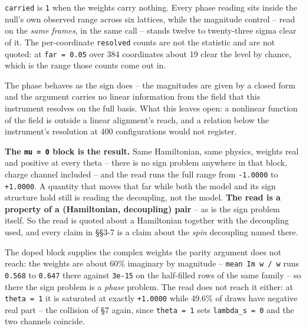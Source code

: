 \documentclass[10pt,letterpaper,twocolumn]{article}
\begin{document}
\texttt{carried} is \texttt{1} when the weights carry nothing. Every phase reading sits inside the null's own
observed range across six lattices, while the magnitude control -- read on the \emph{same frames}, in
the same call -- stands twelve to twenty-three sigma clear of it. The per-coordinate \texttt{resolved}
counts are not the statistic and are not quoted: at \texttt{far\ =\allowbreak{}\ 0.\allowbreak{}05} over 384 coordinates about 19
clear the level by chance, which is the range those counts come out in.

The phase behaves as the sign does -- the magnitudes are given by a closed form and the argument
carries no linear information from the field that this instrument resolves on the full basis. What
this leaves open: a nonlinear function of the field is outside a linear alignment's reach, and a
relation below the instrument's resolution at 400 configurations would not register.

\textbf{The \texttt{mu\ =\allowbreak{}\ 0} block is the result.} Same Hamiltonian, same physics, weights real and positive at
every theta -- there is no sign problem anywhere in that block, charge channel included -- and the
read runs the full range from \texttt{-{}\allowbreak{}1.\allowbreak{}0000} to \texttt{+\allowbreak{}1.\allowbreak{}0000}. A quantity that moves that far while both the
model and its sign structure hold still is reading the decoupling, not the model. \textbf{The read is a
property of a (Hamiltonian, decoupling) pair} -- as is the sign problem itself. So the read is
quoted about a Hamiltonian together with the decoupling used, and every claim in §§3-7 is a claim
about the \emph{spin} decoupling named there.

The doped block supplies the complex weights the parity argument does not reach: the weights are
about 60\% imaginary by magnitude -- \texttt{mean\ \textbar{}\allowbreak{}Im\ w\textbar{}\allowbreak{}\ /\allowbreak{}\ \textbar{}\allowbreak{}w\textbar{}\allowbreak{}} runs \texttt{0.\allowbreak{}568} to \texttt{0.\allowbreak{}647} there against
\texttt{3e-{}\allowbreak{}15} on the half-filled rows of the same family -- so there the sign problem is a \emph{phase}
problem. The read does not reach it either: at \texttt{theta\ =\allowbreak{}\ 1} it is saturated at exactly \texttt{+\allowbreak{}1.\allowbreak{}0000}
while 49.6\% of draws have negative real part -- the collision of §7 again, since \texttt{theta\ =\allowbreak{}\ 1} sets
\texttt{lambda\_\allowbreak{}s\ =\allowbreak{}\ 0} and the two channels coincide.
\end{document}
